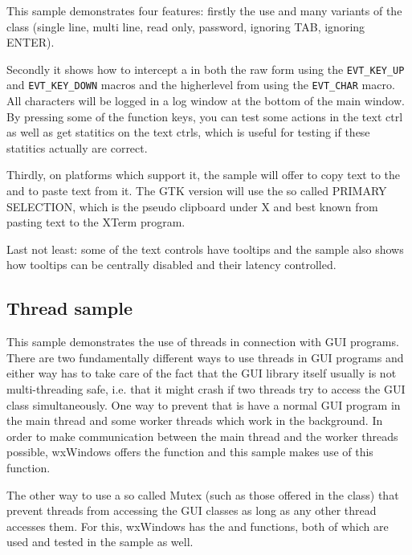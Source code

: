 This sample demonstrates four features: firstly the use and many variants of
the  class (single line, multi line, read only,
password, ignoring TAB, ignoring ENTER).

Secondly it shows how to intercept a  in both
the raw form using the {\tt EVT\_KEY\_UP} and {\tt EVT\_KEY\_DOWN} macros and the
higherlevel from using the {\tt EVT\_CHAR} macro. All characters will be logged
in a log window at the bottom of the main window. By pressing some of the function
keys, you can test some actions in the text ctrl as well as get statitics on the
text ctrls, which is useful for testing if these statitics actually are correct.

Thirdly, on platforms which support it, the sample will offer to copy text to the
 and to paste text from it. The GTK version will
use the so called PRIMARY SELECTION, which is the pseudo clipboard under X and
best known from pasting text to the XTerm program. 

Last not least: some of the text controls have tooltips and the sample also shows
how tooltips can be centrally disabled and their latency controlled.

\subsection{Thread sample}\label{samplethread}

This sample demonstrates the use of threads in connection with GUI programs.
There are two fundamentally different ways to use threads in GUI programs and
either way has to take care of the fact that the GUI library itself usually
is not multi-threading safe, i.e. that it might crash if two threads try to
access the GUI class simultaneously. One way to prevent that is have a normal
GUI program in the main thread and some worker threads which work in the 
background. In order to make communication between the main thread and the
worker threads possible, wxWindows offers the 
function and this sample makes use of this function.

The other way to use a so called Mutex (such as those offered in the 
class) that prevent threads from accessing the GUI classes as long as any other
thread accesses them. For this, wxWindows has the 
and  functions, both of which are
used and tested in the sample as well.

